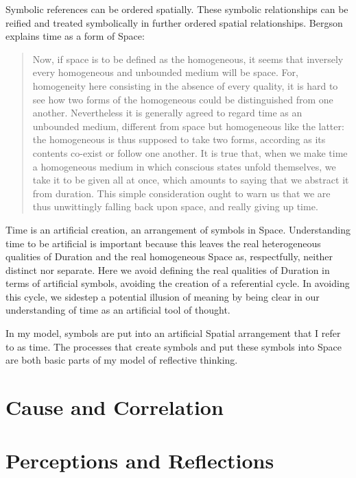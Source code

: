 Symbolic references can be ordered spatially.  These symbolic
relationships can be reified and treated symbolically in further
ordered spatial relationships.  Bergson explains time as a form of
Space:

\begin{quote}
Now, if space is to be defined as the homogeneous, it seems that
inversely every homogeneous and unbounded medium will be space.  For,
homogeneity here consisting in the absence of every quality, it is
hard to see how two forms of the homogeneous could be distinguished
from one another.  Nevertheless it is generally agreed to regard time
as an unbounded medium, different from space but homogeneous like the
latter: the homogeneous is thus supposed to take two forms, according
as its contents co-exist or follow one another.  It is true that, when
we make time a homogeneous medium in which conscious states unfold
themselves, we take it to be given all at once, which amounts to
saying that we abstract it from duration.  This simple consideration
ought to warn us that we are thus unwittingly falling back upon space,
and really giving up time.
\end{quote}

Time is an artificial creation, an arrangement of symbols in Space.
Understanding time to be artificial is important because this leaves
the real heterogeneous qualities of Duration and the real homogeneous
Space as, respectfully, neither distinct nor separate.  Here we avoid
defining the real qualities of Duration in terms of artificial
symbols, avoiding the creation of a referential cycle.  In avoiding
this cycle, we sidestep a potential illusion of meaning by being clear
in our understanding of time as an artificial tool of thought.

In my model, symbols are put into an artificial Spatial arrangement
that I refer to as time.  The processes that create symbols and put
these symbols into Space are both basic parts of my model of
reflective thinking.

\section{Cause and Correlation}



\section{Perceptions and Reflections}



